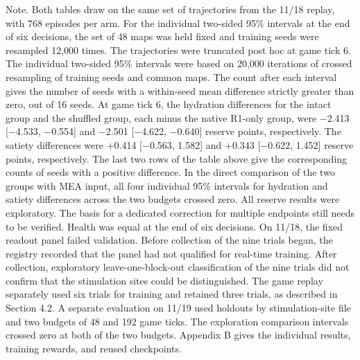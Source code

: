 \documentclass{article}
\begin{document}
Note. Both tables draw on the same set of trajectories from the 11/18 replay, with 768 episodes per arm. For the individual two-sided 95\% intervals at the end of six decisions, the set of 48 maps was held fixed and training seeds were resampled 12,000 times. The trajectories were truncated post hoc at game tick 6. The individual two-sided 95\% intervals were based on 20,000 iterations of crossed resampling of training seeds and common maps. The count after each interval gives the number of seeds with a within-seed mean difference strictly greater than zero, out of 16 seeds. At game tick 6, the hydration differences for the intact group and the shuffled group, each minus the native R1-only group, were \ensuremath{-}2.413 [\ensuremath{-}4.533, \ensuremath{-}0.554] and \ensuremath{-}2.501 [\ensuremath{-}4.622, \ensuremath{-}0.640] reserve points, respectively. The satiety differences were +0.414 [\ensuremath{-}0.563, 1.582] and +0.343 [\ensuremath{-}0.622, 1.452] reserve points, respectively. The last two rows of the table above give the corresponding counts of seeds with a positive difference. In the direct comparison of the two groups with MEA input, all four individual 95\% intervals for hydration and satiety differences across the two budgets crossed zero. All reserve results were exploratory. The basis for a dedicated correction for multiple endpoints still needs to be verified. Health was equal at the end of six decisions. On 11/18, the fixed readout panel failed validation. Before collection of the nine trials began, the registry recorded that the panel had not qualified for real-time training. After collection, exploratory leave-one-block-out classification of the nine trials did not confirm that the stimulation sites could be distinguished. The game replay separately used six trials for training and retained three trials, as described in Section 4.2. A separate evaluation on 11/19 used holdouts by stimulation-site file and two budgets of 48 and 192 game ticks. The exploration comparison intervals crossed zero at both of the two budgets. Appendix B gives the individual results, training rewards, and reused checkpoints.
\end{document}
